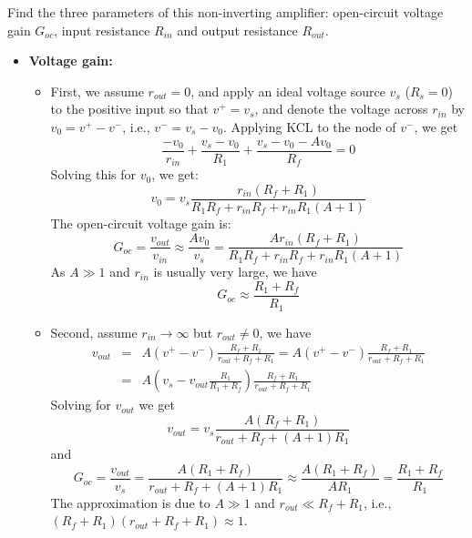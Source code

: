 \documentclass{article}
\begin{document}

  Find the three parameters of this non-inverting amplifier: open-circuit 
  voltage gain $G_{oc}$, input resistance $R_{in}$ and output resistance $R_{out}$.

  \begin{itemize}
    \item {\bf Voltage gain:} 
      \begin{itemize}
      \item First, we assume $r_{out}=0$, and apply an ideal voltage source $v_s$ 
        ($R_s=0$) to the positive input so that $v^+=v_s$, and denote the voltage 
      across $r_{in}$ by $v_0=v^+-v^-$, i.e., $v^-=v_s-v_0$. Applying KCL to 
      the node of $v^-$, we get
      \begin{equation} 
      \frac{-v_0}{r_{in}}+\frac{v_s-v_0}{R_1}+\frac{v_s-v_0-Av_0}{R_f}=0 
      \end{equation}
      Solving this for $v_0$, we get:
      \begin{equation} 
      v_0=v_s \frac{r_{in}(R_f+R_1)}{R_1R_f+r_{in}R_f+r_{in}R_1(A+1)} 
      \end{equation}
      The open-circuit voltage gain is:
      \begin{equation} 
      G_{oc}=\frac{v_{out}}{v_{in}}\approx \frac{Av_0}{v_s}
      =\frac{Ar_{in}(R_f+R_1)}{R_1R_f+r_{in}R_f+r_{in}R_1(A+1)} 
      \end{equation}
      As $A\gg 1$ and $r_{in}$ is usually very large, we have
      \begin{equation} G_{oc}\approx \frac{R_1+R_f}{R_1} \end{equation}

      \item Second, assume $r_{in}\rightarrow \infty$ but $r_{out}\ne 0$,
	we have
      \begin{eqnarray} 
        v_{out}&=&A(v^+-v^-)\frac{R_f+R_1}{r_{out}+R_f+R_1} 
        =A(v^+-v^-)\frac{R_f+R_1}{r_{out}+R_f+R_1} 
        \nonumber\\
        &=&A\left(v_s-v_{out}\frac{R_1}{R_1+R_f}\right) \frac{R_f+R_1}{r_{out}+R_f+R_1} 
        \nonumber
      \end{eqnarray}
      Solving for $v_{out}$ we get
      \begin{equation}
      v_{out} =v_s \frac{A(R_f+R_1)}{r_{out}+R_f+(A+1)R_1} 
      \end{equation}
      and 
      \begin{equation}
      G_{oc}=\frac{v_{out}}{v_s}=\frac{A(R_1+R_f)}{r_{out}+R_f+(A+1)R_1}
      \approx \frac{A(R_1+R_f)}{AR_1}=\frac{R_1+R_f}{R_1} 
      \end{equation}
      The approximation is due to $A\gg 1$ and $r_{out}\ll R_f+R_1$, i.e., 
      $(R_f+R_1)(r_{out}+R_f+R_1)\approx 1$. 


\end{itemize}
\end{itemize}
\end{document}
